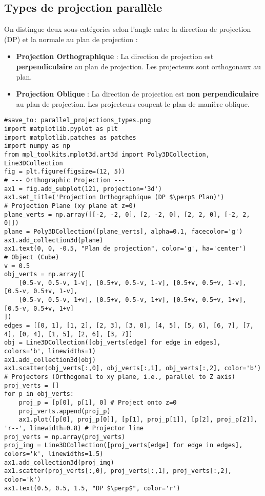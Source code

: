 \subsection{Types de projection parallèle}
On distingue deux sous-catégories selon l'angle entre la direction de projection (DP) et la normale au plan de projection :
\begin{itemize}
    \item \textbf{Projection Orthographique} : La direction de projection est \textbf{perpendiculaire} au plan de projection. Les projecteurs sont orthogonaux au plan.
    \item \textbf{Projection Oblique} : La direction de projection est \textbf{non perpendiculaire} au plan de projection. Les projecteurs coupent le plan de manière oblique.
\end{itemize}
\begin{verbatim}
#save_to: parallel_projections_types.png
import matplotlib.pyplot as plt
import matplotlib.patches as patches
import numpy as np
from mpl_toolkits.mplot3d.art3d import Poly3DCollection, Line3DCollection
fig = plt.figure(figsize=(12, 5))
# --- Orthographic Projection ---
ax1 = fig.add_subplot(121, projection='3d')
ax1.set_title('Projection Orthographique (DP $\perp$ Plan)')
# Projection Plane (xy plane at z=0)
plane_verts = np.array([[-2, -2, 0], [2, -2, 0], [2, 2, 0], [-2, 2, 0]])
plane = Poly3DCollection([plane_verts], alpha=0.1, facecolor='g')
ax1.add_collection3d(plane)
ax1.text(0, 0, -0.5, "Plan de projection", color='g', ha='center')
# Object (Cube)
v = 0.5
obj_verts = np.array([
    [0.5-v, 0.5-v, 1-v], [0.5+v, 0.5-v, 1-v], [0.5+v, 0.5+v, 1-v], [0.5-v, 0.5+v, 1-v],
    [0.5-v, 0.5-v, 1+v], [0.5+v, 0.5-v, 1+v], [0.5+v, 0.5+v, 1+v], [0.5-v, 0.5+v, 1+v]
])
edges = [[0, 1], [1, 2], [2, 3], [3, 0], [4, 5], [5, 6], [6, 7], [7, 4], [0, 4], [1, 5], [2, 6], [3, 7]]
obj = Line3DCollection([obj_verts[edge] for edge in edges], colors='b', linewidths=1)
ax1.add_collection3d(obj)
ax1.scatter(obj_verts[:,0], obj_verts[:,1], obj_verts[:,2], color='b')
# Projectors (Orthogonal to xy plane, i.e., parallel to Z axis)
proj_verts = []
for p in obj_verts:
    proj_p = [p[0], p[1], 0] # Project onto z=0
    proj_verts.append(proj_p)
    ax1.plot([p[0], proj_p[0]], [p[1], proj_p[1]], [p[2], proj_p[2]], 'r--', linewidth=0.8) # Projector line
proj_verts = np.array(proj_verts)
proj_img = Line3DCollection([proj_verts[edge] for edge in edges], colors='k', linewidths=1.5)
ax1.add_collection3d(proj_img)
ax1.scatter(proj_verts[:,0], proj_verts[:,1], proj_verts[:,2], color='k')
ax1.text(0.5, 0.5, 1.5, "DP $\perp$", color='r')

\end{verbatim}
